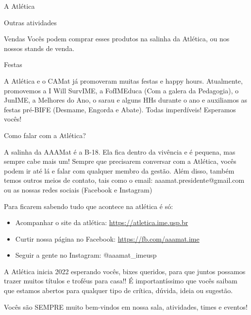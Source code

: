 \begin{secao}{A Atlética}
\begin{subsecao}{Outras atividades}
\begin{subsubsecao}{Vendas}
Vocês podem comprar esses produtos na salinha da Atlética, ou nos nossos
stands de venda.

\end{subsubsecao}
\begin{subsubsecao}{Festas}

A Atlética e o CAMat já promoveram muitas festas e happy hours. Atualmente,
promovemos a I Will SurvIME, a FofIMEduca (Com a galera da Pedagogia), o 
JunIME, a Melhores do Ano, o sarau e alguns HHs durante o ano e auxiliamos 
as festas pré-BIFE (Desmame, Engorda e Abate). Todas imperdíveis!
Esperamos vocês!

\end{subsubsecao}
\begin{subsubsecao}{Como falar com a Atlética?}

A salinha da AAAMat é a B-18. Ela fica dentro da vivência e é pequena, mas
sempre cabe mais um! Sempre que precisarem conversar com a Atlética, vocês
podem ir até lá e falar com qualquer membro da gestão. Além disso, também temos
outros meios de contato, tais como o email: aaamat.presidente@gmail.com  ou as
nossas redes sociais (Facebook e Instagram)

Para ficarem sabendo tudo que acontece na atlética é só:

\begin{itemize}
  \item Acompanhar o site da atlética: \url{https://atletica.ime.usp.br}
  \item Curtir nossa página no Facebook: \url{https://fb.com/aaamat.ime}
  \item Seguir a gente no Instagram: @aaamat\_imeusp
\end{itemize}

A Atlética inicia 2022 esperando vocês, bixes queridos, para que juntos
possamos trazer muitos títulos e troféus para casa!! É importantíssimo que
vocês saibam que estamos abertos para qualquer tipo de crítica, dúvida, ideia
ou sugestão.

Vocês são SEMPRE muito bem-vindos em nossa sala, atividades, times e eventos!
\end{subsubsecao}
\end{subsecao}
\end{secao}
\pagebreak
